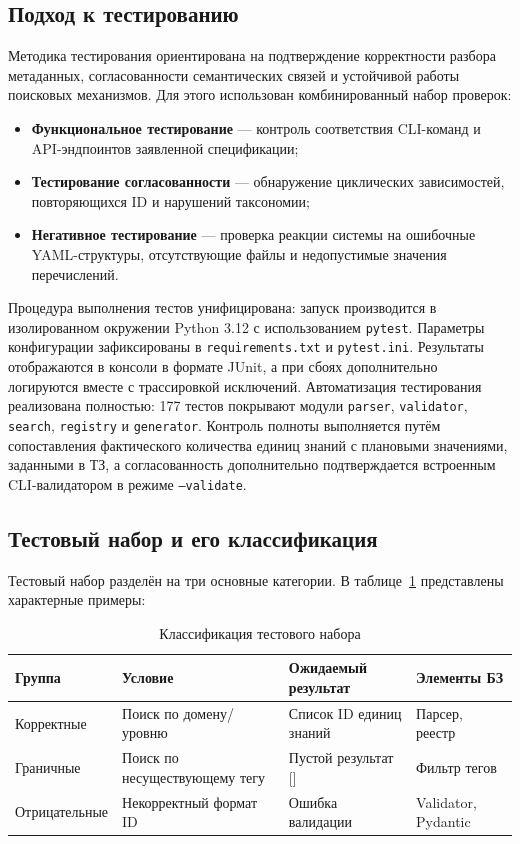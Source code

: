 \subsection{Подход к тестированию}

Методика тестирования ориентирована на подтверждение корректности разбора метаданных, согласованности семантических связей и устойчивой работы поисковых механизмов. Для этого использован комбинированный набор проверок:
\begin{itemize}
    \item \textbf{Функциональное тестирование} — контроль соответствия CLI-команд и API-эндпоинтов заявленной спецификации;
    \item \textbf{Тестирование согласованности} — обнаружение циклических зависимостей, повторяющихся ID и нарушений таксономии;
    \item \textbf{Негативное тестирование} — проверка реакции системы на ошибочные YAML-структуры, отсутствующие файлы и недопустимые значения перечислений.
\end{itemize}

Процедура выполнения тестов унифицирована: запуск производится в изолированном окружении Python 3.12 с использованием \texttt{pytest}. Параметры конфигурации зафиксированы в \texttt{requirements.txt} и \texttt{pytest.ini}. Результаты отображаются в консоли в формате JUnit, а при сбоях дополнительно логируются вместе с трассировкой исключений. Автоматизация тестирования реализована полностью: 177 тестов покрывают модули \texttt{parser}, \texttt{validator}, \texttt{search}, \texttt{registry} и \texttt{generator}. Контроль полноты выполняется путём сопоставления фактического количества единиц знаний с плановыми значениями, заданными в ТЗ, а согласованность дополнительно подтверждается встроенным CLI-валидатором в режиме \texttt{--validate}.

\subsection{Тестовый набор и его классификация}

Тестовый набор разделён на три основные категории. В таблице~\ref{tab:test_classification} представлены характерные примеры:

\newpage

\begin{table}[h]
\centering
\caption{Классификация тестового набора}
\label{tab:test_classification}
\begin{tabular}{|l|p{3.5cm}|p{3cm}|p{2.5cm}|}
\hline
\textbf{Группа} & \textbf{Условие} & \textbf{Ожидаемый результат} & \textbf{Элементы БЗ} \\ \hline
Корректные & Поиск по домену/уровню & Список ID единиц знаний & Парсер, реестр \\ \hline
Граничные & Поиск по несуществующему тегу & Пустой результат [] & Фильтр тегов \\ \hline
Отрицательные & Некорректный формат ID & Ошибка валидации & Validator, Pydantic \\ \hline
\end{tabular}
\end{table}

